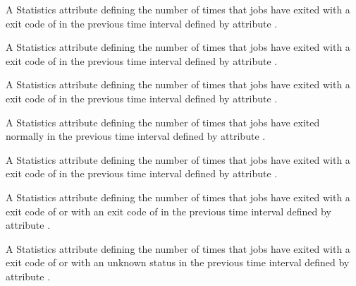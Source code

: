 \begin{description}
\item[\AdAttr{RecentJobsCoredumped}:] A Statistics attribute defining
  the number of times that jobs have exited 
  with a  exit code of  
  in the previous time interval defined by attribute .

\item[\AdAttr{RecentJobsDebugLogError}:] A Statistics attribute defining
  the number of times that jobs have exited 
  with a  exit code of  
  in the previous time interval defined by attribute .

\item[\AdAttr{RecentJobsExecFailed}:] A Statistics attribute defining
  the number of times that jobs have exited 
  with a  exit code of  
  in the previous time interval defined by attribute .

\item[\AdAttr{RecentJobsExited}:] A Statistics attribute defining
  the number of times that jobs have exited normally
  in the previous time interval defined by attribute .

\item[\AdAttr{RecentJobsExitedAndClaimClosing}:] A Statistics attribute defining
  the number of times that jobs 
  have exited with a  exit code of 
  in the previous time interval defined by attribute .

\item[\AdAttr{RecentJobsExitedNormally}:] A Statistics attribute defining
  the number of times that jobs have exited 
  with a  exit code of  or with an
  exit code of 
  in the previous time interval defined by attribute .

\item[\AdAttr{RecentJobsExitException}:] A Statistics attribute defining
  the number of times that jobs 
  have exited with a  exit code of 
  or with an unknown status
  in the previous time interval defined by attribute .


\end{description}
